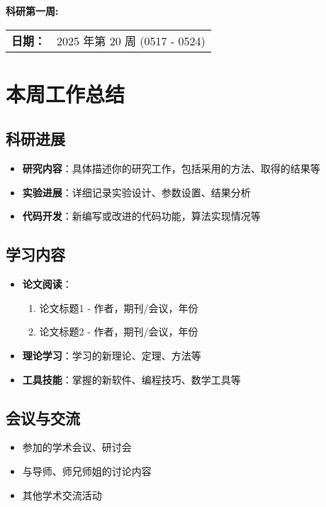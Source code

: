 \documentclass[12pt,a4paper]{article}
\begin{document}
\begin{center}
    \vspace*{1cm}
        {\Large\bfseries 科研第一周: }\\[1cm]
    
    \begin{tabular}{ll}
        \textbf{日期：} & 2025 年第 20 周 (0517 - 0524) \\[0.3cm]
    \end{tabular}
\end{center}


\section{本周工作总结}

\subsection{科研进展}
\begin{itemize}
    \item \textbf{研究内容}：具体描述你的研究工作，包括采用的方法、取得的结果等
    \item \textbf{实验进展}：详细记录实验设计、参数设置、结果分析
    \item \textbf{代码开发}：新编写或改进的代码功能，算法实现情况等
\end{itemize}

\subsection{学习内容}
\begin{itemize}
    \item \textbf{论文阅读}：
    \begin{enumerate}
        \item 论文标题1 - 作者，期刊/会议，年份
        \item 论文标题2 - 作者，期刊/会议，年份
    \end{enumerate}
    \item \textbf{理论学习}：学习的新理论、定理、方法等
    \item \textbf{工具技能}：掌握的新软件、编程技巧、数学工具等
\end{itemize}

\subsection{会议与交流}
\begin{itemize}
    \item 参加的学术会议、研讨会
    \item 与导师、师兄师姐的讨论内容
    \item 其他学术交流活动
\end{itemize}
\end{document}
